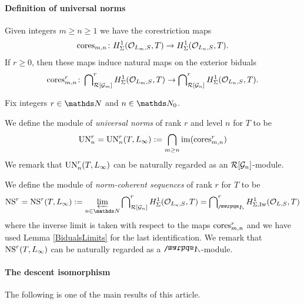\documentclass[a4paper, 
headsepline=off, DIV=12, titlepage=false]{scrartcl}
\begin{document}
\paragraph{Definition of universal norms}

Given integers $m \geq n \geq 1$ we have the corestriction maps
\begin{align*}
    \mathrm{cores}_{m,n} \colon H^1_\Sigma(\mathcal{O}_{L_m, S}, T) \to H^1_\Sigma(\mathcal{O}_{L_n, S}, T).
\end{align*}
If $r \geq 0$, then these maps induce natural maps on the exterior biduals
\begin{align*}
    \mathrm{cores}_{m,n}^r \colon \bigcap\nolimits_{\mathcal{R}[\mathcal{G}_m]}^r H^1_\Sigma(\mathcal{O}_{L_m, S}, T) \to \bigcap\nolimits_{\mathcal{R}[\mathcal{G}_n]}^r H^1_\Sigma(\mathcal{O}_{L_n, S}, T).
\end{align*}

\begin{definition}\label{UN-definition}
    Fix integers $r \in \N$ and $n \in \NN_0$. 
    \begin{liste}
    \item We define the module of \emph{universal norms} of rank $r$ and level $n$ for $T$ to be
    \begin{align*}
        \mathrm{UN}^r_n = \mathrm{UN}^r_n(T,L_\infty) := \bigcap_{m \geq n} \operatorname{im}(\mathrm{cores}_{m,n}^r)
    \end{align*}
    We remark that $\mathrm{UN}^r_n(T,L_\infty)$ can be naturally regarded as an $\mathcal{R}[\mathcal{G}_n]$-module.
    \item We define the module of \emph{norm-coherent sequences} of rank $r$ for $T$ to be
    \begin{align*}
        \NS^r = \NS^r(T,L_\infty) := \varprojlim_{n \in \NN} \bidual_{\cR[\cG_n]}^r H^1_\Sigma(\cO_{L_n, S}, T)
        = \bidual^r_\bLambda H^1_{\Sigma, \text{Iw}} ( \cO_{L, S}, T)
    \end{align*}
    where the inverse limit is taken with respect to the maps $\mathrm{cores}_{m,n}^r$ and we have used Lemma \ref{BidualsLimits} for the last identification. We remark that $\mathrm{NS}^r(T,L_\infty)$ can be naturally regarded as a $\bLambda$-module.
    \end{liste}
\end{definition}


\paragraph{The descent isomorphism}
The following is one of the main results of this article. 
\end{document}
